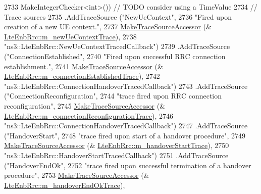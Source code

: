 \begin{DoxyCode}
2733         MakeIntegerChecker<int>()) \textcolor{comment}{// TODO consider using a TimeValue  }
2734     \textcolor{comment}{// Trace sources}
2735     .AddTraceSource (\textcolor{stringliteral}{"NewUeContext"},
2736                      \textcolor{stringliteral}{"Fired upon creation of a new UE context."},
2737                      \hyperlink{group__tracing_gab21a770b9855af4e8f69f7531ea4a6b0}{MakeTraceSourceAccessor} (&
      \hyperlink{classns3_1_1LteEnbRrc_a9df01020b6a3a37842a029c30f2314db}{LteEnbRrc::m\_newUeContextTrace}),
2738                      \textcolor{stringliteral}{"ns3::LteEnbRrc::NewUeContextTracedCallback"})
2739     .AddTraceSource (\textcolor{stringliteral}{"ConnectionEstablished"},
2740                      \textcolor{stringliteral}{"Fired upon successful RRC connection establishment."},
2741                      \hyperlink{group__tracing_gab21a770b9855af4e8f69f7531ea4a6b0}{MakeTraceSourceAccessor} (&
      \hyperlink{classns3_1_1LteEnbRrc_af189365b7174515e14d078971bc56990}{LteEnbRrc::m\_connectionEstablishedTrace}),
2742                      \textcolor{stringliteral}{"ns3::LteEnbRrc::ConnectionHandoverTracedCallback"})
2743     .AddTraceSource (\textcolor{stringliteral}{"ConnectionReconfiguration"},
2744                      \textcolor{stringliteral}{"trace fired upon RRC connection reconfiguration"},
2745                      \hyperlink{group__tracing_gab21a770b9855af4e8f69f7531ea4a6b0}{MakeTraceSourceAccessor} (&
      \hyperlink{classns3_1_1LteEnbRrc_abd0a3deec4a7123637d9604616e934df}{LteEnbRrc::m\_connectionReconfigurationTrace}),
2746                      \textcolor{stringliteral}{"ns3::LteEnbRrc::ConnectionHandoverTracedCallback"})
2747     .AddTraceSource (\textcolor{stringliteral}{"HandoverStart"},
2748                      \textcolor{stringliteral}{"trace fired upon start of a handover procedure"},
2749                      \hyperlink{group__tracing_gab21a770b9855af4e8f69f7531ea4a6b0}{MakeTraceSourceAccessor} (&
      \hyperlink{classns3_1_1LteEnbRrc_a1823b75aad2734d49d4ba83963bdd6fe}{LteEnbRrc::m\_handoverStartTrace}),
2750                      \textcolor{stringliteral}{"ns3::LteEnbRrc::HandoverStartTracedCallback"})
2751     .AddTraceSource (\textcolor{stringliteral}{"HandoverEndOk"},
2752                      \textcolor{stringliteral}{"trace fired upon successful termination of a handover procedure"},
2753                      \hyperlink{group__tracing_gab21a770b9855af4e8f69f7531ea4a6b0}{MakeTraceSourceAccessor} (&
      \hyperlink{classns3_1_1LteEnbRrc_afbb60c6381e72a45c833d2940fb64bdc}{LteEnbRrc::m\_handoverEndOkTrace}),

\end{DoxyCode}
